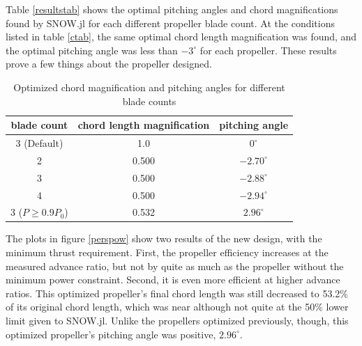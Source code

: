 \documentclass[journal ]{new-aiaa}
\newcounter{ctab}
\begin{document}
Table \eqref{resultstab} shows the optimal pitching angles and chord magnifications found by SNOW.jl for each different propeller blade count. At the conditions listed in table \eqref{ctab}, the same optimal chord length magnification was found, and the optimal pitching angle was less than $-3^{\circ}$ for each propeller. These results prove a few things about the propeller designed.

\begin{table}[H]
 \centering
 \begin{tabular}{| c | c | c |} \hline
 	 \textbf{blade count} & \textbf{chord length magnification} & \textbf{pitching angle} \\ \hline
  	 3 (Default) & 1.0 & $0^{\circ}$ \\ \hline
  	 2 & 0.500 & $-2.70^{\circ}$ \\ \hline
  	 3 & 0.500 & $-2.88^{\circ}$ \\ \hline
  	 4 & 0.500 & $-2.94^{\circ}$ \\ \hline
	 3 ($P \geq 0.9 P_{0}$) & 0.532 & $2.96^{\circ}$ \\ \hline
 \end{tabular}
 \caption{Optimized chord magnification and pitching angles for different blade counts}
 \label{resultstab}
\end{table}

The plots in figure \eqref{perspow} show two results of the new design, with the minimum thrust requirement. First, the propeller efficiency increases at the measured advance ratio, but not by quite as much as the propeller without the minimum power constraint. Second, it is even more efficient at higher advance ratios. This optimized propeller's final chord length was still decreased to 53.2\% of its original chord length, which was near although not quite at the 50\% lower limit given to SNOW.jl. Unlike the propellers optimized previously, though, this optimized propeller's pitching angle was positive, $2.96^{\circ}$.
\end{document}

